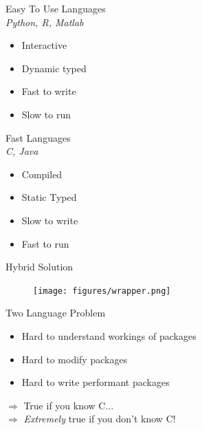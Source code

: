 \documentclass[11pt]{beamer}
\begin{document}
\begin{frame}{}
\centering
\pause
    \begin{minipage}[t]{0.48\linewidth}
        \begin{center}
            Easy To Use Languages\\
            \emph{Python, R, Matlab}
        \end{center}
        \begin{itemize}
            \item<3-> Interactive
            \item<4-> Dynamic typed
            \item<5-> Fast to write
            \item<6-> Slow to run
        \end{itemize}
    \end{minipage}
    \vrule{}
    \begin{minipage}[t]{0.48\linewidth}%
        \begin{center}
            Fast Languages\\
            \emph{C, Java}
        \end{center}
        \begin{itemize}
            \item<3-> Compiled
            \item<4-> Static Typed
            \item<5-> Slow to write
            \item<6-> Fast to run
        \end{itemize}
    \end{minipage}
\end{frame}

\begin{frame}[c]{Hybrid Solution}
    \begin{figure}
        \texttt{[image: figures/wrapper.png]}
    \end{figure}
\end{frame}

\begin{frame}[c]{Two Language Problem}
\begin{itemize}
    \pause \item Hard to \alert{understand} workings of packages
    \pause \item Hard to \alert{modify} packages
    \pause \item Hard to \alert{write} performant packages
\end{itemize}
\pause
\vspace*{1cm}
$\Rightarrow$ True if you know C... \\
\pause $\Rightarrow$ \emph{Extremely} true if you don't know C!
\end{frame}
\end{document}
